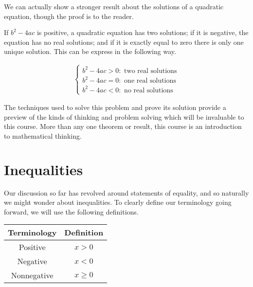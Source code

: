 We can actually show a stronger result about the solutions of a quadratic equation, though the proof is to the reader.

\begin{theorem}
	If $b^2 - 4ac$ is positive, a quadratic equation has two solutions; if it is negative, the equation has no real solutions; and if it is exactly equal to zero there is only one unique solution. This can be express in the following way.
	
	\begin{align*}
		\begin{cases}
			b^2 - 4ac > 0 : \text{ two real solutions} \\
			b^2 - 4ac = 0 : \text{ one real solutions} \\
			b^2 - 4ac < 0 : \text{ no real solutions}
		\end{cases}
	\end{align*}
\end{theorem}


The techniques used to solve this problem and prove its solution provide a preview of the kinds of thinking and problem solving which will be invaluable to this course. More than any one theorem or result, this course is an introduction to mathematical thinking.

\section{Inequalities}

Our discussion so far has revolved around statements of equality, and so naturally we might wonder about inequalities. To clearly define our terminology going forward, we will use the following definitions.

\vspace{\baselineskip}
\begin{center}
	\begin{tabular}{cc}
		\toprule
		Terminology & Definition \\
		\midrule
		Positive & $x > 0$ \\
		Negative & $x < 0$ \\
		Nonnegative & $x \ge 0$ \\
		\bottomrule
	\end{tabular}
\end{center}
\vspace{\baselineskip}


